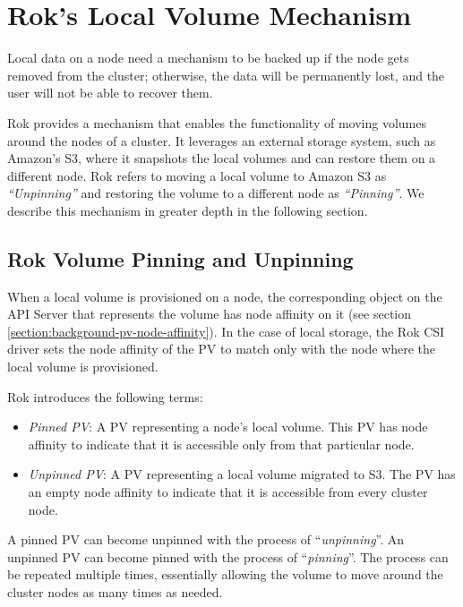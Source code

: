 \section{Rok's Local Volume Mechanism}

Local data on a node need a mechanism to be backed up if the node gets removed
from the cluster; otherwise, the data will be permanently lost, and the user
will not be able to recover them.

Rok provides a mechanism that enables the functionality of moving volumes around
the nodes of a cluster. It leverages an external storage system, such as
Amazon's S3, where it snapshots the local volumes and can restore them on a
different node. Rok refers to moving a local volume to Amazon S3 as
\textit{``Unpinning''} and restoring the volume to a different node as
\textit{``Pinning''}. We describe this mechanism in greater depth in the
following section.

\subsection{Rok Volume Pinning and Unpinning}

\label{section:rok-volume-pinning}

When a local volume is provisioned on a node, the corresponding
 object on the API Server that represents the volume has
node affinity on it (see section \ref{section:background-pv-node-affinity}). In
the case of local storage, the Rok CSI driver sets the node affinity of the PV
to match only with the node where the local volume is provisioned.


Rok introduces the following terms:
\begin{itemize}
	\tightlist

	\item \textit{Pinned PV}: A PV representing a node's local volume. This PV
	      has node affinity to indicate that it is accessible only from that
	      particular node.
	\item \textit{Unpinned PV}: A PV representing a local volume migrated to S3.
	      The PV has an empty node affinity to indicate that it is accessible
	      from every cluster node.
\end{itemize}

A pinned PV can become unpinned with the process of ``\textit{unpinning}''. An
unpinned PV can become pinned with the process of ``\textit{pinning}''. The
process can be repeated multiple times, essentially allowing the volume to move
around the cluster nodes as many times as needed.

